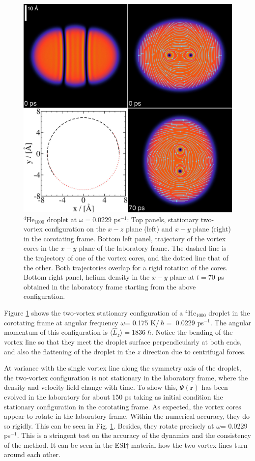 \begin{figure}[h]
\centerline{\includegraphics[width=0.8\linewidth,clip]{fig7}}
\caption{\label{fig7}
$^4$He$_{1000}$ droplet at $\omega= 0.0229$ ps$^{-1}$: Top panels, stationary 
two-vortex configuration on the $x-z$ plane (left) and  $x-y$ plane (right)  in the corotating frame.
Bottom left panel, trajectory of the vortex cores 
in the $x-y$ plane of the laboratory frame. 
The dashed line is the trajectory of one of the vortex cores, and the dotted line that of the other. Both trajectories  overlap for a rigid rotation of the cores.
Bottom right panel, helium density in the $x-y$ plane at $t=70$ ps obtained in the laboratory frame starting from the above configuration.\cite{ESI} 
}
\end{figure}

Figure \ref{fig7} shows the two-vortex  
stationary configuration of a $^4$He$_{1000}$ droplet  in the corotating frame 
at angular frequency $\omega$= 0.175 K/\,$\hbar=$ 0.0229 ps$^{-1}$. 
The angular momentum  of this configuration is  $\langle \hat{L}_z \rangle = 1836 \; \hbar$. 
Notice the bending 
of the vortex line so that they meet  
the droplet surface perpendicularly at both ends, and also the 
flattening of the droplet in the $z$ direction
due to centrifugal forces.

At variance with the single vortex line along the symmetry 
axis of the droplet, the two-vortex  configuration is not stationary in the laboratory frame, 
where the density and velocity field change with time. 
To show this, $\Psi(\mathbf{r})$ has been evolved 
in the laboratory  for about 150 ps
taking as initial condition the stationary 
configuration in the corotating frame. 
As expected, the vortex cores appear to rotate in the laboratory frame. 
Within the numerical accuracy, they do so rigidly. This can be seen in 
Fig. \ref{fig7}. Besides, they rotate precisely at 
$\omega$= 0.0229 ps$^{-1}$. This is a  stringent test 
on the accuracy of the dynamics and the consistency of the method.
It can be seen in the ESI$\dag$ 
material how  the two vortex lines turn around each other.

